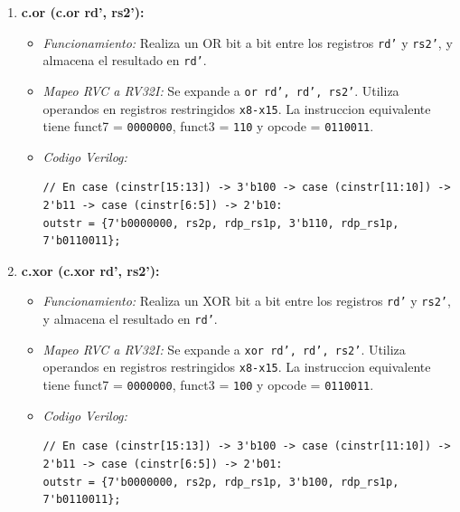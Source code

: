 \documentclass[12pt, a4paper]{article}
\begin{document}
\begin{enumerate}
    \item \textbf{c.or (c.or rd', rs2'):}
    \begin{itemize}
        \item \textit{Funcionamiento:} Realiza un OR bit a bit entre los registros \texttt{rd'} y \texttt{rs2'}, y almacena el resultado en \texttt{rd'}.
        \item \textit{Mapeo RVC a RV32I:} Se expande a \texttt{or rd', rd', rs2'}. Utiliza operandos en registros restringidos \texttt{x8-x15}. La instruccion equivalente tiene funct7 = \texttt{0000000}, funct3 = \texttt{110} y opcode = \texttt{0110011}.
        \item \textit{Codigo Verilog:}
        \begin{lstlisting}[style=verilogstyle]
// En case (cinstr[15:13]) -> 3'b100 -> case (cinstr[11:10]) -> 2'b11 -> case (cinstr[6:5]) -> 2'b10:
outstr = {7'b0000000, rs2p, rdp_rs1p, 3'b110, rdp_rs1p, 7'b0110011};
        \end{lstlisting}
    \end{itemize}

    \item \textbf{c.xor (c.xor rd', rs2'):}
    \begin{itemize}
        \item \textit{Funcionamiento:} Realiza un XOR bit a bit entre los registros \texttt{rd'} y \texttt{rs2'}, y almacena el resultado en \texttt{rd'}.
        \item \textit{Mapeo RVC a RV32I:} Se expande a \texttt{xor rd', rd', rs2'}. Utiliza operandos en registros restringidos \texttt{x8-x15}. La instruccion equivalente tiene funct7 = \texttt{0000000}, funct3 = \texttt{100} y opcode = \texttt{0110011}.
        \item \textit{Codigo Verilog:}
        \begin{lstlisting}[style=verilogstyle]
// En case (cinstr[15:13]) -> 3'b100 -> case (cinstr[11:10]) -> 2'b11 -> case (cinstr[6:5]) -> 2'b01:
outstr = {7'b0000000, rs2p, rdp_rs1p, 3'b100, rdp_rs1p, 7'b0110011};
        \end{lstlisting}
    \end{itemize}


\end{enumerate}
\end{document}
